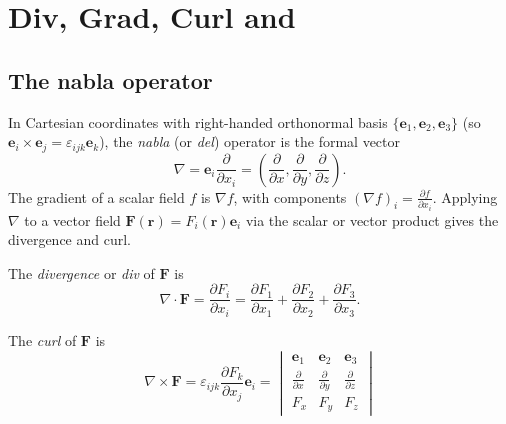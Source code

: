 \documentclass[a4paper]{article}
\begin{document}
\section{Div, Grad, Curl and }
\subsection{The nabla operator}

\begin{defi}
  In Cartesian coordinates with right-handed orthonormal basis $\{\mathbf{e}_1, \mathbf{e}_2, \mathbf{e}_3\}$ (so $\mathbf{e}_i\times \mathbf{e}_j = \varepsilon_{ijk} \mathbf{e}_k$), the \emph{nabla} (or \emph{del}) operator is the formal vector
  \[
    \nabla = \mathbf{e}_i \frac{\partial}{\partial x_i} = \left(\frac{\partial}{\partial x}, \frac{\partial }{\partial y}, \frac{\partial}{\partial z}\right).
  \]
  The gradient of a scalar field $f$ is $\nabla f$, with components $(\nabla f)_i = \frac{\partial f}{\partial x_i}$. Applying $\nabla$ to a vector field $\mathbf{F}(\mathbf{r}) = F_i(\mathbf{r})\mathbf{e}_i$ via the scalar or vector product gives the divergence and curl.
\end{defi}

\begin{defi}[Divergence]
  The \emph{divergence} or \emph{div} of $\mathbf{F}$ is
  \[
    \nabla\cdot \mathbf{F} = \frac{\partial F_i}{\partial x_i} = \frac{\partial F_1}{\partial x_1} + \frac{\partial F_2}{\partial x_2} + \frac{\partial F_3}{\partial x_3}.
  \]
\end{defi}

\begin{defi}[Curl]
  The \emph{curl} of $\mathbf{F}$ is
  \[
    \nabla\times \mathbf{F} = \varepsilon_{ijk}\frac{\partial F_k}{\partial x_j}\mathbf{e}_i = \begin{vmatrix}
      \mathbf{e}_1 & \mathbf{e}_2 & \mathbf{e}_3\\
      \frac{\partial}{\partial x} & \frac{\partial}{\partial y} & \frac{\partial}{\partial z}\\
      F_x & F_y & F_z
    \end{vmatrix}
  \]
\end{defi}
\end{document}

